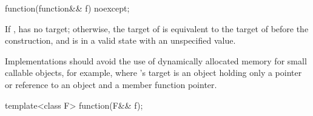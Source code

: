 %
\begin{itemdecl}
function(function&& f) noexcept;
\end{itemdecl}

\begin{itemdescr}
\pnum
\ensures
If ,  has no target;
otherwise, the target of  is equivalent to
the target of  before the construction, and
 is in a valid state with an unspecified value.

\pnum
\recommended
Implementations should avoid the use of
dynamically allocated memory for small callable objects, for example,
where 's target is an object holding only a pointer or reference
to an object and a member function pointer.
\end{itemdescr}

%
\begin{itemdecl}
template<class F> function(F&& f);
\end{itemdecl}

